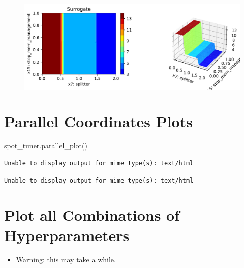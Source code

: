 \documentclass[
  letterpaper,
  DIV=11,
  numbers=noendperiod]{scrreprt}
\newenvironment{Shaded}{\begin{snugshade}}{\end{snugshade}}
\newcommand{\NormalTok}[1]{\textcolor[rgb]{0.00,0.23,0.31}{#1}}
\providecommand{\tightlist}{%
  \setlength{\itemsep}{0pt}\setlength{\parskip}{0pt}}\usepackage{longtable,booktabs,array}
\begin{document}
\begin{figure}[H]

{\centering \includegraphics{13_spot_hpt_river_files/figure-pdf/cell-44-output-7.pdf}

}

\end{figure}

\hypertarget{parallel-coordinates-plots}{%
\section{Parallel Coordinates Plots}\label{parallel-coordinates-plots}}

\begin{Shaded}
\begin{Highlighting}[]
\NormalTok{spot\_tuner.parallel\_plot()}
\end{Highlighting}
\end{Shaded}

\begin{verbatim}
Unable to display output for mime type(s): text/html
\end{verbatim}

\begin{verbatim}
Unable to display output for mime type(s): text/html
\end{verbatim}

\hypertarget{plot-all-combinations-of-hyperparameters-1}{%
\section{Plot all Combinations of
Hyperparameters}\label{plot-all-combinations-of-hyperparameters-1}}

\begin{itemize}
\tightlist
\item
  Warning: this may take a while.
\end{itemize}
\end{document}

